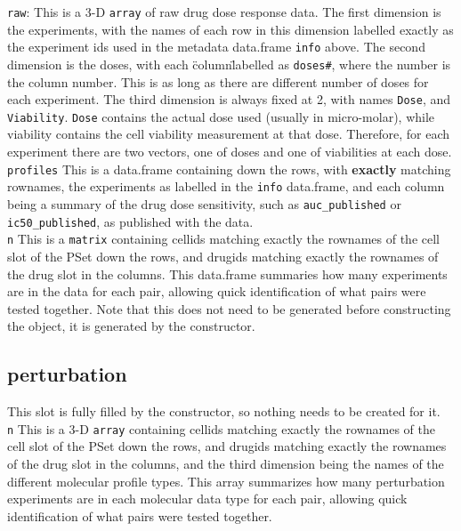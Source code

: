 \documentclass[11pt]{article}
\begin{document}
\texttt{raw}: This is a 3-D \texttt{array} of raw drug dose response data. The first dimension is the experiments, with the names of each row in this dimension labelled exactly as the experiment ids used in the metadata data.frame \texttt{info} above. The second dimension is the doses, with each \"column\" labelled as \texttt{doses\#}, where the number is the column number. This is as long as there are different number of doses for each experiment. The third dimension is always fixed at 2, with names \texttt{Dose}, and \texttt{Viability}. \texttt{Dose} contains the actual dose used (usually in micro-molar), while viability contains the cell viability measurement at that dose. Therefore, for each experiment there are two vectors, one of doses and one of viabilities at each dose. \\

\texttt{profiles} This is a data.frame containing down the rows, with \textbf{exactly} matching rownames, the experiments as labelled in the \texttt{info} data.frame, and each column being a summary of the drug dose sensitivity, such as \texttt{auc\_published} or \texttt{ic50\_published}, as published with the data. \\

\texttt{n} This is a \texttt{matrix} containing cellids matching exactly the rownames of the cell slot of the PSet down the rows, and drugids matching exactly the rownames of the drug slot in the columns. This data.frame summaries how many experiments are in the data for each pair, allowing quick identification of what pairs were tested together. Note that this does not need to be generated before constructing the object, it is generated by the constructor.


\subsection{perturbation}

This slot is fully filled by the constructor, so nothing needs to be created for it.  \\

\texttt{n} This is a 3-D \texttt{array} containing cellids matching exactly the rownames of the cell slot of the PSet down the rows, and drugids matching exactly the rownames of the drug slot in the columns, and the third dimension being the names of the different molecular profile types. This array summarizes how many perturbation experiments are in each molecular data type for each pair, allowing quick identification of what pairs were tested together.\\
\end{document}
